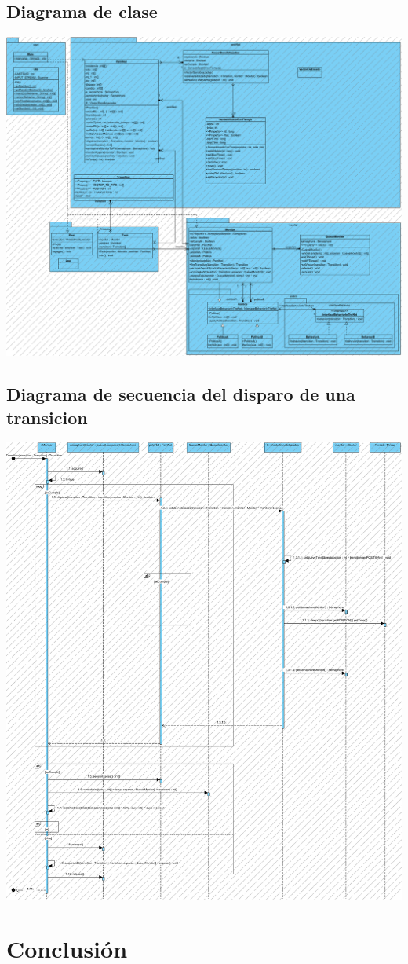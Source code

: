 \documentclass[12pt]{article}
\begin{document}
\subsection{Diagrama de clase}{
\includegraphics[width=\textwidth,height=\textheight,keepaspectratio]{Diagrama_Clase.png}
\pagebreak

}
\subsection{Diagrama de secuencia del disparo de una transicion}
\includegraphics[width=\textwidth,height=\textheight,keepaspectratio]{Secuencia_Transicion.png}
\pagebreak
\section{Conclusión}
\pagebreak
\end{document}
